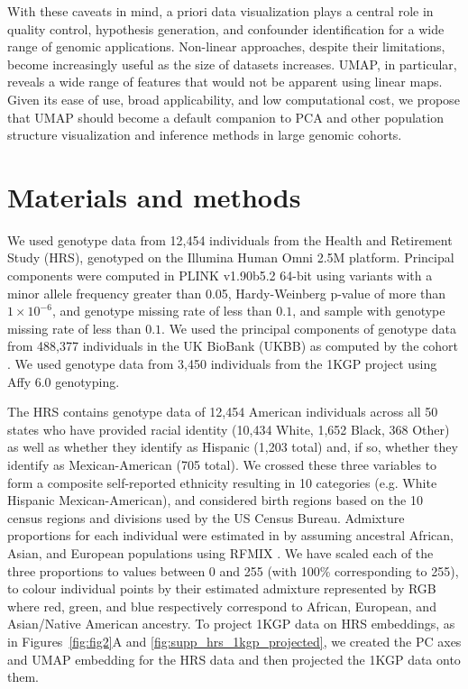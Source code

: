 With these caveats in mind, a priori data visualization plays a central role in quality control, hypothesis generation, and confounder identification for a wide range of genomic applications. Non-linear approaches, despite their limitations, become increasingly useful as the size of datasets increases. UMAP, in particular, reveals a wide range of features that would not be apparent using linear maps. Given its ease of use, broad applicability, and low computational cost, we propose that UMAP should become a default companion to PCA and other population structure visualization and inference methods in large genomic cohorts.

\section{Materials and methods}
We used genotype data from 12,454 individuals from the Health and Retirement Study (HRS), genotyped on the Illumina Human Omni 2.5M platform\citep{juster1995overview}. Principal components were computed in PLINK v1.90b5.2 64-bit\citep{purcell2007plink} using variants with a minor allele frequency greater than 0.05, Hardy-Weinberg p-value of more than $1\times 10^{-6}$, and genotype missing rate of less than $0.1$, and sample with genotype missing rate of less than $0.1$. We used the principal components of genotype data from 488,377 individuals in the UK BioBank (UKBB) as computed by the cohort \citep{sudlow2015uk}. We used genotype data from 3,450 individuals from the 1KGP project using Affy 6.0 genotyping\citep{10002015global}.

The HRS contains genotype data of 12,454 American individuals across all 50 states who have provided racial identity (10,434 White, 1,652 Black, 368 Other) as well as whether they identify as Hispanic (1,203 total) and, if so, whether they identify as Mexican-American (705 total)\citep{juster1995overview}. We crossed these three variables to form a composite self-reported ethnicity resulting in 10 categories (e.g. White Hispanic Mexican-American), and considered birth regions based on the 10 census regions and divisions used by the US Census Bureau. Admixture proportions for each individual were estimated in \citep{baharian2016great} by assuming ancestral African, Asian, and European populations using RFMIX \citep{Maples:2013fia}. We have scaled each of the three proportions to values between 0 and 255 (with 100\% corresponding to 255), to colour individual points by their estimated admixture represented by RGB where red, green, and blue respectively correspond to African, European, and Asian/Native American ancestry. To project 1KGP data on HRS embeddings, as in Figures~\ref{fig:fig2}A and \ref{fig:supp_hrs_1kgp_projected}, we created the PC axes and UMAP embedding for the HRS data and then projected the 1KGP data onto them.

